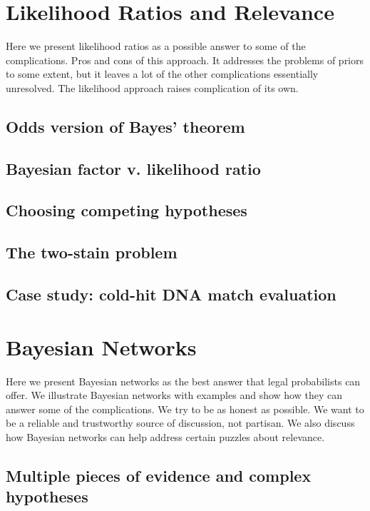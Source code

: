 \documentclass[]{book}
\begin{document}
\chapter{Likelihood Ratios and Relevance}

Here we present likelihood ratios as a possible answer to some of the
complications. Pros and cons of this approach. It addresses the problems
of priors to some extent, but it leaves a lot of the other complications
essentially unresolved. The likelihood approach raises complication of
its own.

\section{Odds version of Bayes' theorem}

\section{Bayesian factor v. likelihood ratio}

\section{Choosing competing hypotheses}

\section{The two-stain problem}

\section{Case study: cold-hit DNA match evaluation}

\chapter{Bayesian Networks}

Here we present Bayesian networks as the best answer that legal
probabilists can offer. We illustrate Bayesian networks with examples
and show how they can answer some of the complications. We try to be as
honest as possible. We want to be a reliable and trustworthy source of
discussion, not partisan. We also discuss how Bayesian networks can help
address certain puzzles about relevance.

\section{Multiple pieces of evidence and complex hypotheses}
\end{document}
